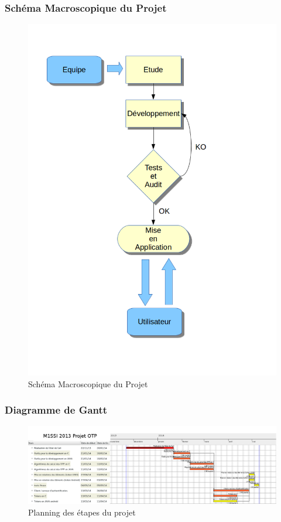 \documentclass[xcolor=table]{beamer}
\begin{document}
\begin{frame}
\frametitle{Schéma Macroscopique du Projet}
\begin{figure}[h]
  \centering
  \includegraphics[scale=0.2]{../graphics/diagramme1.png}
  \caption{Schéma Macroscopique du Projet}
  \setlength{\parindent}{1cm}
\end{figure}
\end{frame}

\begin{frame}
\frametitle{Diagramme de Gantt}
  \begin{figure}
    \includegraphics[scale=0.22]{img/gantt.png}
    \caption{Planning des étapes du projet}
  \end{figure}
\end{frame}
\end{document}
